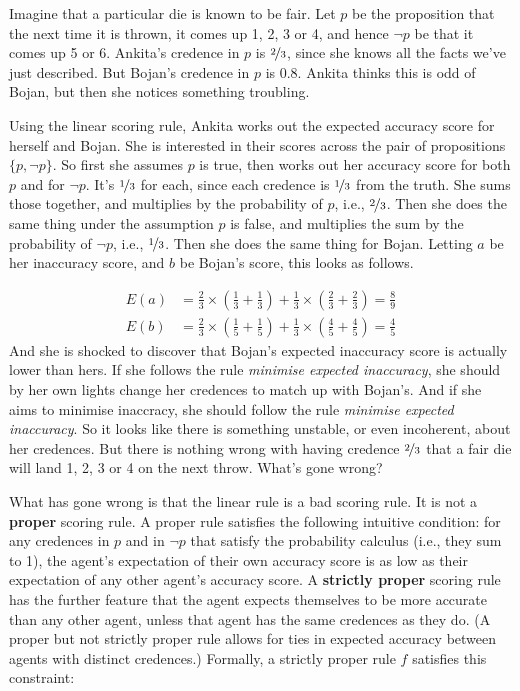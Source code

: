 Imagine that a particular die is known to be fair. Let $p$ be the proposition that the next time it is thrown, it comes up 1, 2, 3 or 4, and hence $\neg p$ be that it comes up 5 or 6. Ankita's credence in $p$ is $\nicefrac{2}{3}$, since she knows all the facts we've just described. But Bojan's credence in $p$ is 0.8. Ankita thinks this is odd of Bojan, but then she notices something troubling.

Using the linear scoring rule, Ankita works out the expected accuracy score for herself and Bojan. She is interested in their scores across the pair of propositions $\{p, \neg p \}$. So first she assumes $p$ is true, then works out her accuracy score for both $p$ and for $\neg p$. It's $\nicefrac{1}{3}$ for each, since each credence is $\nicefrac{1}{3}$ from the truth. She sums those together, and multiplies by the probability of $p$, i.e., $\nicefrac{2}{3}$. Then she does the same thing under the assumption $p$ is false, and multiplies the sum by the probability of $\neg p$, i.e., $\nicefrac{1}{3}$. Then she does the same thing for Bojan. Letting $a$ be her inaccuracy score, and $b$ be Bojan's score, this looks as follows.

\begin{align*}
E(a) &= \frac{2}{3} \times (\frac{1}{3} + \frac{1}{3}) + \frac{1}{3} \times (\frac{2}{3} + \frac{2}{3}) = \frac{8}{9} \\
E(b) &= \frac{2}{3} \times (\frac{1}{5} + \frac{1}{5}) + \frac{1}{3} \times (\frac{4}{5} + \frac{4}{5}) = \frac{4}{5} 
\end{align*}
And she is shocked to discover that Bojan's expected inaccuracy score is actually lower than hers. If she follows the rule \textit{minimise expected inaccuracy}, she should by her own lights change her credences to match up with Bojan's. And if she aims to minimise inaccracy, she should follow the rule \textit{minimise expected inaccuracy}. So it looks like there is something unstable, or even incoherent, about her credences. But there is nothing wrong with having credence $\nicefrac{2}{3}$ that a fair die will land 1, 2, 3 or 4 on the next throw. What's gone wrong?

What has gone wrong is that the linear rule is a bad scoring rule. It is not a \textbf{proper} scoring rule. A proper rule satisfies the following intuitive condition: for any credences in $p$ and in $\neg p$ that satisfy the probability calculus (i.e., they sum to 1), the agent's expectation of their own accuracy score is as low as their expectation of any other agent's accuracy score. A \textbf{strictly proper} scoring rule has the further feature that the agent expects themselves to be more accurate than any other agent, unless that agent has the same credences as they do. (A proper but not strictly proper rule allows for ties in expected accuracy between agents with distinct credences.) Formally, a strictly proper rule $f$ satisfies this constraint:

